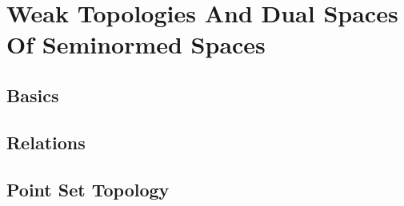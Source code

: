 \section{Weak Topologies And Dual Spaces Of Seminormed Spaces}

\subsection{Basics}












\subsection{Relations}



















\subsection{Point Set Topology}






%



